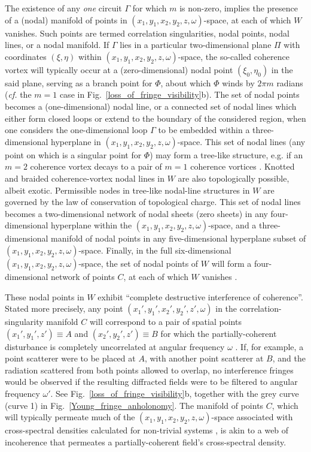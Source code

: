 \documentclass{iucr}              %
\begin{document}
The existence of any {\em one} circuit $\Gamma$ for which $m$ is non-zero, implies the presence of a (nodal) manifold of points in $(x_1,y_1,x_2,y_2,z,\omega)$-space, at each of which $W$ vanishes.   Such points are termed correlation singularities, nodal points, nodal lines, or a nodal manifold.  If $\Gamma$ lies in a particular two-dimensional plane $\Pi$ with coordinates $(\xi,\eta)$ within $(x_1,y_1,x_2,y_2,z,\omega)$-space, the so-called coherence vortex \cite{GburVisser2003} will typically occur at a (zero-dimensional) nodal point $(\xi_0,\eta_0)$ in the said plane, serving as a branch point for $\Phi$, about which $\Phi$ winds by $2 \pi m$ radians ({\em cf.} the $m=1$ case in Fig.~\ref{loss_of_fringe_visibility}b).  The set of nodal points becomes a (one-dimensional) nodal line, or a connected set of nodal lines which either form closed loops or extend to the boundary of the considered region, when one considers the one-dimensional loop $\Gamma$ to be embedded within a three-dimensional hyperplane in  $(x_1,y_1,x_2,y_2,z,\omega)$-space.  This set of nodal lines (any point on which is a singular point for $\Phi$) may form a tree-like structure, e.g. if an $m=2$ coherence vortex decays to a pair of $m=1$ coherence vortices \cite{TopologicalReactionsCohVortices,GburSPIE}.  Knotted and braided coherence-vortex nodal lines in $W$ are also topologically possible, albeit exotic.  Permissible nodes in tree-like nodal-line structures in $W$ are governed by the law of conservation of topological charge.  This set of nodal lines becomes a two-dimensional network of nodal sheets (zero sheets) in any four-dimensional hyperplane within the $(x_1,y_1,x_2,y_2,z,\omega)$-space, and a three-dimensional manifold of nodal points in any five-dimensional hyperplane subset of $(x_1,y_1,x_2,y_2,z,\omega)$-space.  Finally, in the full six-dimensional $(x_1,y_1,x_2,y_2,z,\omega)$-space, the set of nodal points of $W$ will form a four-dimensional network of points $C$, at each of which $W$ vanishes \cite{Marasinghe2010}.  

These nodal points in $W$ exhibit ``complete destructive interference of coherence''.  Stated more precisely, any point $(x_1',y_1',x_2',y_2',z',\omega)$ in the correlation-singularity manifold $C$ will correspond to a pair of spatial points $(x_1',y_1',z')\equiv A$ and $(x_2',y_2',z')\equiv B$ for which the partially-coherent disturbance is completely uncorrelated at angular frequency $\omega$ \cite{Schouten2003,GburVisser2003,Bogatyryova2003}.  If, for example, a point scatterer were to be placed at $A$, with another point scatterer at $B$, and the radiation scattered from both points allowed to overlap, no interference fringes would be observed if the resulting diffracted fields were to be filtered to angular frequency $\omega'$.  See Fig.~\ref{loss_of_fringe_visibility}b, together with the grey curve (curve 1) in Fig.~\ref{Young_fringe_anholonomy}.  The manifold of points $C$, which will typically permeate much of the $(x_1,y_1,x_2,y_2,z,\omega)$-space associated with cross-spectral densities calculated for non-trivial systems \cite{TopologicalReactionsCohVortices,GburVisser2003}, is akin to a web of incoherence that permeates a partially-coherent field's cross-spectral density.
\end{document}
